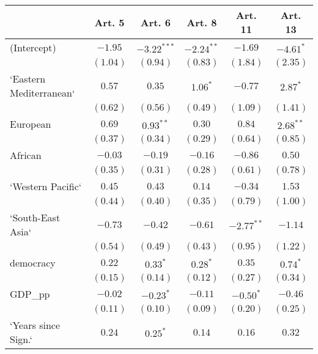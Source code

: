 
\begin{table}[!h]
\begin{center}
\begin{tabular}{l c c c c c }
\toprule
 & Art. 5 & Art. 6 & Art. 8 & Art. 11 & Art. 13 \\
\midrule
(Intercept)             & $-1.95$      & $-3.22^{***}$ & $-2.24^{**}$ & $-1.69$      & $-4.61^{*}$  \\
                        & $(1.04)$     & $(0.94)$      & $(0.83)$     & $(1.84)$     & $(2.35)$     \\
`Eastern Mediterranean` & $0.57$       & $0.35$        & $1.06^{*}$   & $-0.77$      & $2.87^{*}$   \\
                        & $(0.62)$     & $(0.56)$      & $(0.49)$     & $(1.09)$     & $(1.41)$     \\
European                & $0.69$       & $0.93^{**}$   & $0.30$       & $0.84$       & $2.68^{**}$  \\
                        & $(0.37)$     & $(0.34)$      & $(0.29)$     & $(0.64)$     & $(0.85)$     \\
African                 & $-0.03$      & $-0.19$       & $-0.16$      & $-0.86$      & $0.50$       \\
                        & $(0.35)$     & $(0.31)$      & $(0.28)$     & $(0.61)$     & $(0.78)$     \\
`Western Pacific`       & $0.45$       & $0.43$        & $0.14$       & $-0.34$      & $1.53$       \\
                        & $(0.44)$     & $(0.40)$      & $(0.35)$     & $(0.79)$     & $(1.00)$     \\
`South-East Asia`       & $-0.73$      & $-0.42$       & $-0.61$      & $-2.77^{**}$ & $-1.14$      \\
                        & $(0.54)$     & $(0.49)$      & $(0.43)$     & $(0.95)$     & $(1.22)$     \\
democracy               & $0.22$       & $0.33^{*}$    & $0.28^{*}$   & $0.35$       & $0.74^{*}$   \\
                        & $(0.15)$     & $(0.14)$      & $(0.12)$     & $(0.27)$     & $(0.34)$     \\
GDP\_pp                 & $-0.02$      & $-0.23^{*}$   & $-0.11$      & $-0.50^{*}$  & $-0.46$      \\
                        & $(0.11)$     & $(0.10)$      & $(0.09)$     & $(0.20)$     & $(0.25)$     \\
`Years since Sign.`     & $0.24$       & $0.25^{*}$    & $0.14$       & $0.16$       & $0.32$       \\

\end{tabular}
\end{center}
\end{table}
